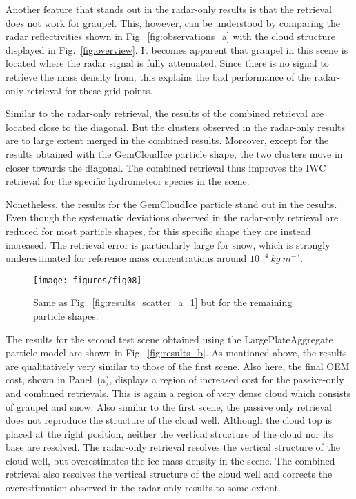 \documentclass[journal abbreviation, manuscript]{copernicus}
\begin{document}
Another feature that stands out in the radar-only results is that the retrieval
does not work for graupel. This, however, can be understood by comparing the
radar reflectivities shown in Fig.~\ref{fig:observations_a} with the cloud
structure displayed in Fig.~\ref{fig:overview}. It becomes apparent that graupel
in this scene is located where the radar signal is fully attenuated. Since there
is no signal to retrieve the mass density from, this explains the bad
performance of the radar-only retrieval for these grid points.

Similar to the radar-only retrieval, the results of the combined retrieval are
located close to the diagonal. But the clusters observed in the radar-only
results are to large extent merged in the combined results. Moreover, except for
the results obtained with the GemCloudIce particle shape, the two clusters move
in closer towards the diagonal. The combined retrieval thus improves the IWC
retrieval for the specific hydrometeor species in the scene.

Nonetheless, the results for the GemCloudIce particle stand out in the results.
Even though the systematic deviations observed in the radar-only retrieval are
reduced for most particle shapes, for this specific shape they are instead
increased. The retrieval error is particularly large for snow, which is strongly
underestimated for reference mass concentrations around $10^{-4} \ \unit{kg\ m^{-3}}$.

\begin{figure}
\centering
\texttt{[image: figures/fig08]}
\caption{Same as Fig.~\ref{fig:results_scatter_a_1} but for the remaining particle
  shapes.}
\label{fig:results_scatter_a_2}
\end{figure}


The results for the second test scene obtained using the LargePlateAggregate
particle model are shown in Fig.~\ref{fig:results_b}. As mentioned above, the
results are qualitatively very similar to those of the first scene. Also here,
the final OEM cost, shown in Panel~(a), displays a region of increased cost for
the passive-only and combined retrievals. This is again a region of very dense
cloud which consists of graupel and snow. Also similar to the first scene, the
passive only retrieval does not reproduce the structure of the cloud well.
Although the cloud top is placed at the right position, neither the vertical
structure of the cloud nor its base are resolved. The radar-only retrieval
resolves the vertical structure of the cloud well, but overestimates the ice
mass density in the scene. The combined retrieval also resolves the vertical
structure of the cloud well and corrects the overestimation observed in the
radar-only results to some extent.
\end{document}
